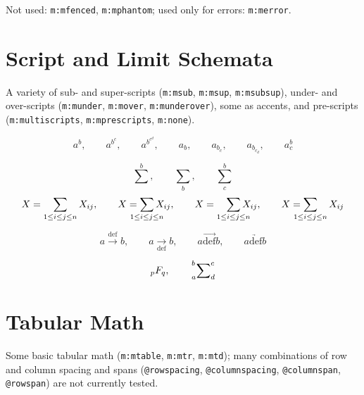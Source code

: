 \documentclass{article}
\makeatletter
\newcommand{\mml}[1]{\texttt{m:#1}}
\newcommand{\attr}[1]{\texttt{@#1}}
\makeatother
\begin{document}
Not used: \mml{mfenced}, \mml{mphantom};
used only for errors: \mml{merror}.

\section{Script and Limit Schemata}
A variety of sub- and super-scripts (\mml{msub}, \mml{msup}, \mml{msubsup}),
under- and over-scripts (\mml{munder}, \mml{mover}, \mml{munderover}),
some as accents, and pre-scripts (\mml{multiscripts}, \mml{mprescripts}, \mml{none}).

\begin{equation}
 a^{b},\qquad
 a^{b^{c}},\qquad
 a^{b^{c^{d}}},\qquad
 a_{b},\qquad
 a_{b_{c}},\qquad
 a_{b_{c_ {d}}},\qquad
 a^{b}_{c} 
\end{equation}

\begin{equation}
 \sum^{b},\qquad
 \sum_{b},\qquad
 \sum^{b}_{c}
\end{equation}
\begin{equation}
X = \sum_{1\le i \le j \le n} X_{ij},\qquad
X = \sum_{\mathclap{1\le i \le j \le n}} X_{ij},\qquad
X = \smashoperator[r]{\sum_{1\le i \le j \le n}} X_{ij},\qquad
X = \smashoperator[l]{\sum_{1\le i \le j \le n}} X_{ij}
\end{equation}

\begin{equation}
 a \overset{\mathrm{def}}{\rightarrow} b, \qquad
 a \underset{\mathrm{def}}{\rightarrow} b,\qquad
 a \overrightarrow{\mathrm{def}} b,\qquad
 a \underrightarrow{\mathrm{def}} b
\end{equation}

\begin{equation}
 {}_p F_q,\qquad
 \sideset{_a^b}{^c_d}{\sum}
\end{equation}

\section{Tabular Math}
Some basic tabular math (\mml{mtable}, \mml{mtr}, \mml{mtd});
many combinations of row and column spacing and spans
(\attr{rowspacing}, \attr{columnspacing}, \attr{columnspan}, \attr{rowspan})
are not currently tested.
\end{document}
